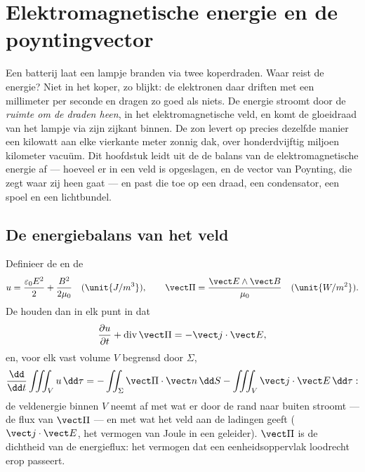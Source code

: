 \chapter{Elektromagnetische energie en de
poyntingvector}\label{ch:b2:poynting-vector}

Een batterij laat een lampje branden via twee koperdraden. Waar reist de
energie? Niet in het koper, zo blijkt: de elektronen daar driften met een
millimeter per seconde en dragen zo goed als niets. De energie stroomt door
de \emph{ruimte om de draden heen}, in het elektromagnetische veld, en komt
de gloeidraad van het lampje via zijn zijkant binnen. De zon levert op
precies dezelfde manier een kilowatt aan elke vierkante meter zonnig dak,
over honderdvijftig miljoen kilometer vacuüm. Dit hoofdstuk leidt uit de
 de balans van de elektromagnetische energie af
--- hoeveel er in een veld is opgeslagen, en de vector van Poynting, die
zegt waar zij heen gaat --- en past die toe op een draad, een condensator,
een spoel en een lichtbundel.

\section{De energiebalans van het veld}

\begin{theorem}\label{thm:b2:poynting-vector:poynting}
Definieer de \emph{} en de \emph{}
\[
u = \frac{\varepsilon_0E^2}2 + \frac{B^2}{2\mu_0} \quad (\unit{J/m^3}) , \qquad
\vect\Pi = \frac{\vect E\wedge\vect B}{\mu_0} \quad (\unit{W/m^2}) .
\]
De  houden dan in elk punt in dat
\[
\frac{\partial u}{\partial t} + \operatorname{div}\vect\Pi = -\vect j\cdot\vect E ,
\]
en, voor elk vast volume $V$ begrensd door $\Sigma$,
\[
\frac{\dd}{\dd t}\iiint_Vu\,\dd\tau = -\iint_\Sigma\vect\Pi\cdot\vect n\,\dd S - \iiint_V\vect j\cdot\vect E\,\dd\tau :
\]
de veldenergie binnen $V$ neemt af met wat er door de rand naar buiten
stroomt --- de flux van $\vect\Pi$ --- en met wat het veld aan de ladingen
geeft ($\vect j\cdot\vect E$, het vermogen van Joule in een geleider).
$\vect\Pi$ is de dichtheid van de energieflux: het vermogen dat een
eenheidsoppervlak loodrecht erop passeert.
\end{theorem}

